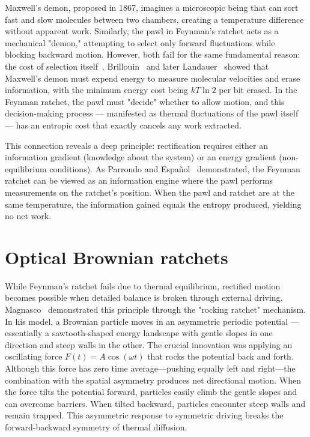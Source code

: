 Maxwell's demon, proposed in 1867, imagines a microscopic being that can sort fast and slow molecules between two chambers, creating a temperature difference without apparent work. Similarly, the pawl in Feynman's ratchet acts as a mechanical "demon," attempting to select only forward fluctuations while blocking backward motion. However, both fail for the same fundamental reason: the cost of selection itself~\cite{maxwell1871theory, maxwell1867letter}.
Brillouin~\cite{brillouin1951maxwell} and later Landauer~\cite{landauer1961irreversibility} showed that Maxwell's demon must expend energy to measure molecular velocities and erase information, with the minimum energy cost being $kT\ln{2}$ per bit erased. In the Feynman ratchet, the pawl must "decide" whether to allow motion, and this decision-making process — manifested as thermal fluctuations of the pawl itself — has an entropic cost that exactly cancels any work extracted.

This connection reveals a deep principle: rectification requires either an information gradient (knowledge about the system) or an energy gradient (non-equilibrium conditions). As Parrondo and Español~\cite{parrondo1996criticism} demonstrated, the Feynman ratchet can be viewed as an information engine where the pawl performs measurements on the ratchet's position. When the pawl and ratchet are at the same temperature, the information gained equals the entropy produced, yielding no net work.


\section{Optical Brownian ratchets}
\label{sct:brownianratchets}

While Feynman's ratchet fails due to thermal equilibrium, rectified motion becomes possible when detailed balance is broken through external driving. Magnasco~\cite{magnasco1993forced} demonstrated this principle through the "rocking ratchet" mechanism. In his model, a Brownian particle moves in an asymmetric periodic potential — essentially a sawtooth-shaped energy landscape with gentle slopes in one direction and steep walls in the other.
The crucial innovation was applying an oscillating force $F(t) = A\cos(\omega t)$ that rocks the potential back and forth. Although this force has zero time average—pushing equally left and right—the combination with the spatial asymmetry produces net directional motion. When the force tilts the potential forward, particles easily climb the gentle slopes and can overcome barriers. When tilted backward, particles encounter steep walls and remain trapped. This asymmetric response to symmetric driving breaks the forward-backward symmetry of thermal diffusion.

